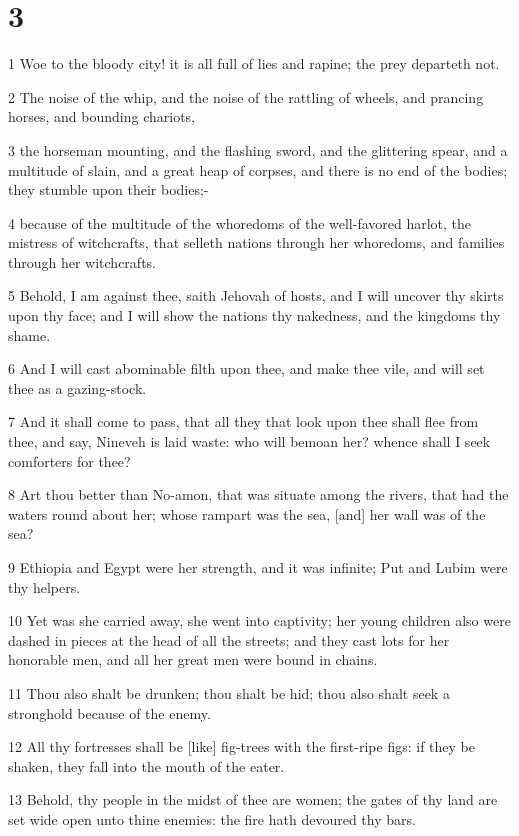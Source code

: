 \chapter{3}

\par 1 Woe to the bloody city! it is all full of lies and rapine; the prey departeth not.
\par 2 The noise of the whip, and the noise of the rattling of wheels, and prancing horses, and bounding chariots,
\par 3 the horseman mounting, and the flashing sword, and the glittering spear, and a multitude of slain, and a great heap of corpses, and there is no end of the bodies; they stumble upon their bodies;-
\par 4 because of the multitude of the whoredoms of the well-favored harlot, the mistress of witchcrafts, that selleth nations through her whoredoms, and families through her witchcrafts.
\par 5 Behold, I am against thee, saith Jehovah of hosts, and I will uncover thy skirts upon thy face; and I will show the nations thy nakedness, and the kingdoms thy shame.
\par 6 And I will cast abominable filth upon thee, and make thee vile, and will set thee as a gazing-stock.
\par 7 And it shall come to pass, that all they that look upon thee shall flee from thee, and say, Nineveh is laid waste: who will bemoan her? whence shall I seek comforters for thee?
\par 8 Art thou better than No-amon, that was situate among the rivers, that had the waters round about her; whose rampart was the sea, [and] her wall was of the sea?
\par 9 Ethiopia and Egypt were her strength, and it was infinite; Put and Lubim were thy helpers.
\par 10 Yet was she carried away, she went into captivity; her young children also were dashed in pieces at the head of all the streets; and they cast lots for her honorable men, and all her great men were bound in chains.
\par 11 Thou also shalt be drunken; thou shalt be hid; thou also shalt seek a stronghold because of the enemy.
\par 12 All thy fortresses shall be [like] fig-trees with the first-ripe figs: if they be shaken, they fall into the mouth of the eater.
\par 13 Behold, thy people in the midst of thee are women; the gates of thy land are set wide open unto thine enemies: the fire hath devoured thy bars.
